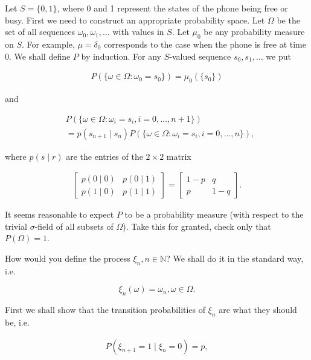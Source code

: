 \begin{Proof}
Let $S = \{0,1\}$, where 0 and 1 represent the states of the phone being free or busy. First we need to construct an appropriate probability space. Let $\Omega$ be the set of all sequences $\omega_0, \omega_1, \ldots$ with values in $S$. Let $\mu_0$ be any probability measure on $S$. For example, $\mu = \delta_0$ corresponds to the case when the phone is free at time 0. We shall define $P$ by induction. For any $S$-valued sequence $s_0, s_1, \ldots$ we put

\begin{align}
P(\{\omega\in\Omega : \omega_0 = s_0\}) = \mu_0(\{s_0\}) \tag{5.11}
\end{align}

and

\begin{align}
&P(\{\omega\in\Omega : \omega_i = s_i, i=0,\ldots,n+1\}) \tag{5.12} \\
&= p(s_{n+1} \mid s_n) P(\{\omega\in\Omega : \omega_i = s_i, i=0,\ldots,n\}),
\end{align}

where $p(s \mid r)$ are the entries of the $2\times 2$ matrix

\begin{align}
\begin{bmatrix}
p(0 \mid 0) & p(0 \mid 1) \\
p(1 \mid 0) & p(1 \mid 1)
\end{bmatrix}
=
\begin{bmatrix}
1-p & q \\
p & 1-q
\end{bmatrix}.
\end{align}

It seems reasonable to expect $P$ to be a probability measure (with respect to the trivial $\sigma$-field of all subsets of $\Omega$). Take this for granted, check only that $P(\Omega) = 1$.

How would you define the process $\xi_n, n\in\mathbb{N}$? We shall do it in the standard way, i.e.

\begin{equation}
\xi_n(\omega) = \omega_n, \omega\in\Omega. \tag{5.13}
\end{equation}

First we shall show that the transition probabilities of $\xi_n$ are what they should be, i.e.

\begin{align}
P(\xi_{n+1} = 1 \mid \xi_n = 0) = p, \tag{5.14}
\end{align}


\end{Proof}

